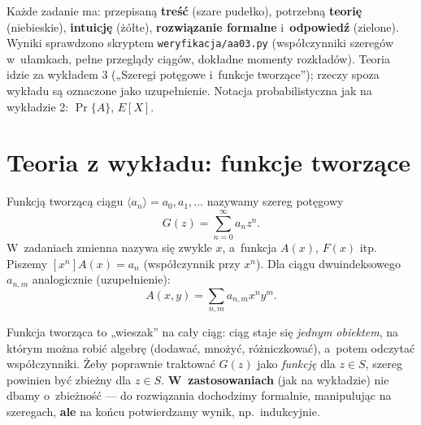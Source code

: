 \documentclass[11pt]{article}
\begin{document}

\begin{teoria}
Każde zadanie ma: przepisaną \textbf{treść} (szare pudełko), potrzebną
\textbf{teorię} (niebieskie), \textbf{intuicję} (żółte), \textbf{rozwiązanie
formalne} i~\textbf{odpowiedź} (zielone). Wyniki sprawdzono skryptem
\texttt{weryfikacja/aa03.py} (współczynniki szeregów w~ułamkach, pełne
przeglądy ciągów, dokładne momenty rozkładów).
Teoria idzie za wykładem 3 („Szeregi potęgowe i~funkcje tworzące”);
rzeczy spoza wykładu są oznaczone jako uzupełnienie.
Notacja probabilistyczna jak na wykładzie 2: $\Pr\{A\}$, $E[X]$.
\end{teoria}

\section{Teoria z wykładu: funkcje tworzące}

\begin{definicja}
Funkcją tworzącą ciągu $\langle a_n\rangle=a_0,a_1,\dots$ nazywamy szereg
potęgowy
\[
G(z)=\sum_{n=0}^\infty a_nz^n.
\]
W~zadaniach zmienna nazywa się zwykle $x$, a~funkcja $A(x)$, $F(x)$ itp.
Piszemy $[x^n]A(x)=a_n$ (współczynnik przy $x^n$).
Dla ciągu dwuindeksowego $a_{n,m}$ analogicznie (uzupełnienie):
\[
A(x,y)=\sum_{n,m}a_{n,m}x^ny^m.
\]
\end{definicja}

\begin{intuicja}
Funkcja tworząca to „wieszak” na cały ciąg: ciąg staje się \emph{jednym
obiektem}, na którym można robić algebrę (dodawać, mnożyć, różniczkować),
a~potem odczytać współczynniki. Żeby poprawnie traktować $G(z)$ jako
\emph{funkcję} dla $z\in S$, szereg powinien być zbieżny dla $z\in S$.
\textbf{W~zastosowaniach} (jak na wykładzie) nie dbamy o~zbieżność ---
do rozwiązania dochodzimy formalnie, manipulując na szeregach, \textbf{ale}
na końcu potwierdzamy wynik, np.\ indukcyjnie.
\end{intuicja}
\end{document}
